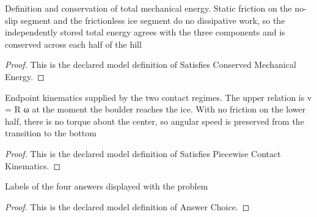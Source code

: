 \begin{definition}
  \label{def:physics:phyx-mini-0789:phyxminiproblems-problemphyxmini0789-satisfiesconservedmechanicalenergy}
  Definition and conservation of total mechanical energy. Static friction on the no-slip segment and the frictionless ice segment do no dissipative work, so the independently stored total energy agrees with the three components and is conserved across each half of the hill
\end{definition}
\begin{proof}
  This is the declared model definition of Satisfies Conserved Mechanical Energy.
\end{proof}
\begin{definition}
  \label{def:physics:phyx-mini-0789:phyxminiproblems-problemphyxmini0789-satisfiespiecewisecontactkinematics}
  Endpoint kinematics supplied by the two contact regimes. The upper relation is v = R ω at the moment the boulder reaches the ice. With no friction on the lower half, there is no torque about the center, so angular speed is preserved from the transition to the bottom
\end{definition}
\begin{proof}
  This is the declared model definition of Satisfies Piecewise Contact Kinematics.
\end{proof}
\begin{definition}
  \label{def:physics:phyx-mini-0789:phyxminiproblems-problemphyxmini0789-answerchoice}
  Labels of the four answers displayed with the problem
\end{definition}
\begin{proof}
  This is the declared model definition of Answer Choice.
\end{proof}
